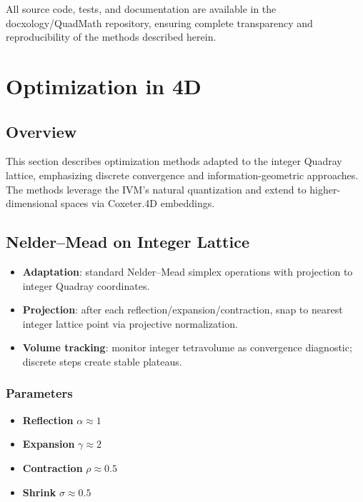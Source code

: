 \documentclass[
  10pt,
]{article}
\providecommand{\tightlist}{%
  \setlength{\itemsep}{0pt}\setlength{\parskip}{0pt}}
\begin{document}
All source code, tests, and documentation are available in the
docxology/QuadMath repository, ensuring complete transparency and
reproducibility of the methods described herein.

\newpage

\hypertarget{optimization-in-4d}{%
\section{Optimization in 4D}\label{optimization-in-4d}}

\hypertarget{overview-2}{%
\subsection{Overview}\label{overview-2}}

This section describes optimization methods adapted to the integer
Quadray lattice, emphasizing discrete convergence and
information-geometric approaches. The methods leverage the IVM's natural
quantization and extend to higher-dimensional spaces via Coxeter.4D
embeddings.

\hypertarget{neldermead-on-integer-lattice}{%
\subsection{Nelder--Mead on Integer
Lattice}\label{neldermead-on-integer-lattice}}

\begin{itemize}
\tightlist
\item
  \textbf{Adaptation}: standard Nelder--Mead simplex operations with
  projection to integer Quadray coordinates.
\item
  \textbf{Projection}: after each reflection/expansion/contraction, snap
  to nearest integer lattice point via projective normalization.
\item
  \textbf{Volume tracking}: monitor integer tetravolume as convergence
  diagnostic; discrete steps create stable plateaus.
\end{itemize}

\hypertarget{parameters}{%
\subsubsection{Parameters}\label{parameters}}

\begin{itemize}
\tightlist
\item
  \textbf{Reflection} \(\alpha \approx 1\)
\item
  \textbf{Expansion} \(\gamma \approx 2\)
\item
  \textbf{Contraction} \(\rho \approx 0.5\)
\item
  \textbf{Shrink} \(\sigma \approx 0.5\)
\end{itemize}
\end{document}
